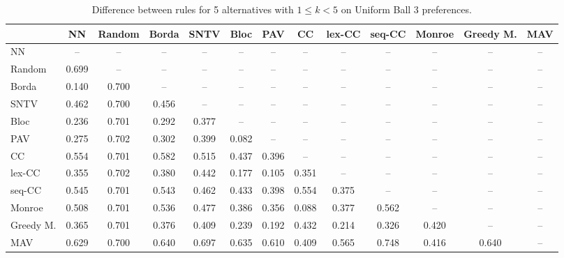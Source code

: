 
\begin{table*}[htbp]
\centering
\begin{tabular}{lcccccccccccc}
\toprule
 & NN & Random & Borda & SNTV & Bloc & PAV & CC & lex-CC & seq-CC & Monroe & Greedy M. & MAV \\
\midrule
NN & -- & -- & -- & -- & -- & -- & -- & -- & -- & -- & -- & -- \\
Random & \cellcolor{blue!69} 0.699 & -- & -- & -- & -- & -- & -- & -- & -- & -- & -- & -- \\
Borda & \cellcolor{blue!14} 0.140 & \cellcolor{blue!70} 0.700 & -- & -- & -- & -- & -- & -- & -- & -- & -- & -- \\
SNTV & \cellcolor{blue!46} 0.462 & \cellcolor{blue!70} 0.700 & \cellcolor{blue!45} 0.456 & -- & -- & -- & -- & -- & -- & -- & -- & -- \\
Bloc & \cellcolor{blue!23} 0.236 & \cellcolor{blue!70} 0.701 & \cellcolor{blue!29} 0.292 & \cellcolor{blue!37} 0.377 & -- & -- & -- & -- & -- & -- & -- & -- \\
PAV & \cellcolor{blue!27} 0.275 & \cellcolor{blue!70} 0.702 & \cellcolor{blue!30} 0.302 & \cellcolor{blue!39} 0.399 & \cellcolor{blue!8} 0.082 & -- & -- & -- & -- & -- & -- & -- \\
CC & \cellcolor{blue!55} 0.554 & \cellcolor{blue!70} 0.701 & \cellcolor{blue!58} 0.582 & \cellcolor{blue!51} 0.515 & \cellcolor{blue!43} 0.437 & \cellcolor{blue!39} 0.396 & -- & -- & -- & -- & -- & -- \\
lex-CC & \cellcolor{blue!35} 0.355 & \cellcolor{blue!70} 0.702 & \cellcolor{blue!38} 0.380 & \cellcolor{blue!44} 0.442 & \cellcolor{blue!17} 0.177 & \cellcolor{blue!10} 0.105 & \cellcolor{blue!35} 0.351 & -- & -- & -- & -- & -- \\
seq-CC & \cellcolor{blue!54} 0.545 & \cellcolor{blue!70} 0.701 & \cellcolor{blue!54} 0.543 & \cellcolor{blue!46} 0.462 & \cellcolor{blue!43} 0.433 & \cellcolor{blue!39} 0.398 & \cellcolor{blue!55} 0.554 & \cellcolor{blue!37} 0.375 & -- & -- & -- & -- \\
Monroe & \cellcolor{blue!50} 0.508 & \cellcolor{blue!70} 0.701 & \cellcolor{blue!53} 0.536 & \cellcolor{blue!47} 0.477 & \cellcolor{blue!38} 0.386 & \cellcolor{blue!35} 0.356 & \cellcolor{blue!8} 0.088 & \cellcolor{blue!37} 0.377 & \cellcolor{blue!56} 0.562 & -- & -- & -- \\
Greedy M. & \cellcolor{blue!36} 0.365 & \cellcolor{blue!70} 0.701 & \cellcolor{blue!37} 0.376 & \cellcolor{blue!40} 0.409 & \cellcolor{blue!23} 0.239 & \cellcolor{blue!19} 0.192 & \cellcolor{blue!43} 0.432 & \cellcolor{blue!21} 0.214 & \cellcolor{blue!32} 0.326 & \cellcolor{blue!42} 0.420 & -- & -- \\
MAV & \cellcolor{blue!62} 0.629 & \cellcolor{blue!70} 0.700 & \cellcolor{blue!64} 0.640 & \cellcolor{blue!69} 0.697 & \cellcolor{blue!63} 0.635 & \cellcolor{blue!61} 0.610 & \cellcolor{blue!40} 0.409 & \cellcolor{blue!56} 0.565 & \cellcolor{blue!74} 0.748 & \cellcolor{blue!41} 0.416 & \cellcolor{blue!64} 0.640 & -- \\
\bottomrule
\end{tabular}

\caption{Difference between rules for 5 alternatives with $1 \leq k < 5$ on Uniform Ball 3 preferences.}
\label{tab:rule_distance_heatmap-m=[5]-pref_dist=euclidean__args__dimensions=3_-_space=uniform_ball}
\end{table*}
    